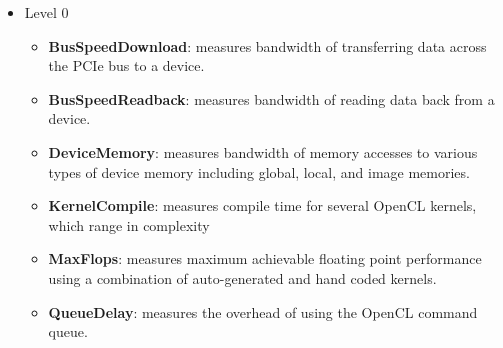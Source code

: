 \documentclass[11pt]{article}
\begin{document}
\begin{itemize}
\item Level 0
    \begin{itemize}
        \item {\bf BusSpeedDownload}: measures bandwidth of transferring data 
         across the PCIe bus to a device.
        \item {\bf BusSpeedReadback}: measures bandwidth of reading data back
        from a device.
        \item {\bf DeviceMemory}: measures bandwidth of memory accesses to 
        various types of device memory including global, local, and image 
        memories.
        \item {\bf KernelCompile}: measures compile time for several OpenCL
        kernels, which range in complexity
        \item {\bf MaxFlops}: measures maximum achievable floating point 
        performance using a combination of auto-generated and hand coded 
        kernels.
        \item {\bf QueueDelay}: measures the overhead of using the OpenCL
        command queue.
    \end{itemize}


\end{itemize}
\end{document}
